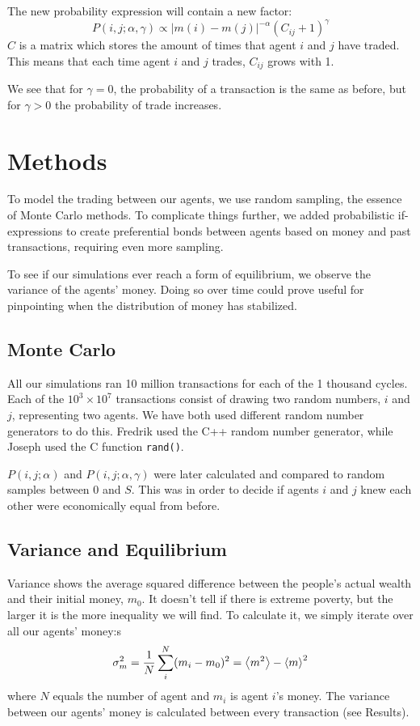 \documentclass[12pt,a4paper]{article}
\begin{document}
The new probability expression will contain a new factor:
\begin{equation}
 P(i,j;\alpha,\gamma) \propto \left|m(i)-m(j) \right|^{-\alpha}(C_{ij} + 1)^{\gamma}
\end{equation}
$C$ is a matrix which stores the amount of times that agent $i$ and $j$ have traded.
This means that each time agent $i$ and $j$ trades, $C_{ij}$ grows with 1.

We see that for $\gamma = 0$, the probability of a transaction is the same as before, but for
$\gamma > 0$ the probability of trade increases.

\clearpage

\section{Methods}

To model the trading between our agents, we use random sampling, the essence of Monte Carlo methods.
To complicate things further, we added probabilistic if-expressions to create preferential bonds between agents based on money and past transactions, requiring even more sampling.

To see if our simulations ever reach a form of equilibrium, we observe the variance of the agents' money. Doing so over time could prove useful for pinpointing when the distribution of money has stabilized.
\subsection{Monte Carlo}
All our simulations ran 10 million transactions for each of  the 1 thousand cycles. Each of the $10^3 \times 10^7$ transactions consist of drawing two random numbers, $i$ and $j$, representing two agents.
We have both used different random number generators to do this. Fredrik used the C++ random number generator, while Joseph used the C function \verb|rand()|.

$P(i,j;\alpha)$ and $P(i,j;\alpha,\gamma)$ were later calculated and compared to random samples between $0$ and $S$. This was in order to decide if agents $i$ and $j$ knew each other were economically equal from before.
\subsection{Variance and Equilibrium}
Variance shows the average squared difference between the people's actual wealth and their initial money, $m_0$. It doesn't tell if there is extreme poverty, but the larger it is the more inequality we will find.
To calculate it, we simply iterate over all our agents' money:s
\begin{equation}
\sigma_m^2 = \frac{1}{N}\sum_i^{N} (m_i - m_0)^2 = \expval{m^2} - \expval{m}^2 \label{eq:sigma}
\end{equation}
where $N$ equals the number of agent and $m_i$ is agent $i$'s money.
The variance between our agents' money is calculated between every transaction (see Results).
\end{document}

